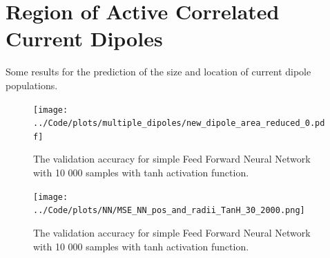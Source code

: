 \documentclass[a4paper, UKenglish, 11pt]{uiomaster}
\begin{document}
\section{Region of Active Correlated Current Dipoles}

Some results for the prediction of the size and location of current dipole populations.

\begin{figure}[!htb]
    \centering
    \texttt{[image: ../Code/plots/multiple\_dipoles/new\_dipole\_area\_reduced\_0.pdf]}
    \caption{The validation accuracy for simple Feed Forward Neural Network with 10 000 samples with tanh activation function.}
    \label{fig:single_dipole_accuracy}
\end{figure}

\begin{figure}[!htb]
    \centering
    \texttt{[image: ../Code/plots/NN/MSE\_NN\_pos\_and\_radii\_TanH\_30\_2000.png]}
    \caption{The validation accuracy for simple Feed Forward Neural Network with 10 000 samples with tanh activation function.}
    \label{fig:single_dipole_accuracy}
\end{figure}
\end{document}
